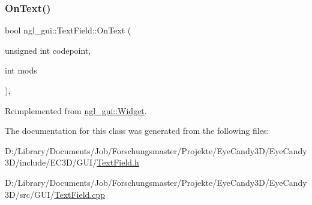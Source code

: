 \subsubsection{\texorpdfstring{On\+Text()}{OnText()}}
{\footnotesize\ttfamily bool ngl\+\_\+gui\+::\+Text\+Field\+::\+On\+Text (\begin{DoxyParamCaption}\item[{unsigned int}]{codepoint,  }\item[{int}]{mods }\end{DoxyParamCaption})\hspace{0.3cm}{\ttfamily [override]}, {\ttfamily [virtual]}}



Reimplemented from \mbox{\hyperlink{classngl__gui_1_1_widget_ab991bcac876f5652190a81beece5f0f1}{ngl\+\_\+gui\+::\+Widget}}.



The documentation for this class was generated from the following files\+:\begin{DoxyCompactItemize}
\item 
D\+:/\+Library/\+Documents/\+Job/\+Forschungsmaster/\+Projekte/\+Eye\+Candy3\+D/\+Eye\+Candy3\+D/include/\+E\+C3\+D/\+G\+U\+I/\mbox{\hyperlink{_text_field_8h}{Text\+Field.\+h}}\item 
D\+:/\+Library/\+Documents/\+Job/\+Forschungsmaster/\+Projekte/\+Eye\+Candy3\+D/\+Eye\+Candy3\+D/src/\+G\+U\+I/\mbox{\hyperlink{_text_field_8cpp}{Text\+Field.\+cpp}}\end{DoxyCompactItemize}

